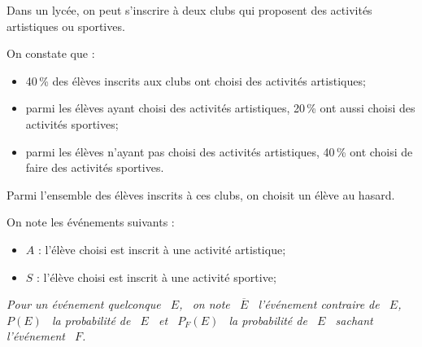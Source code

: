 Dans un lycée, on peut s'inscrire à deux clubs qui proposent des activités artistiques ou sportives.

On constate que :
\begin{itemize}[label=$\bullet$]
	\item 40\,\% des élèves inscrits aux clubs ont choisi des activités artistiques;
	\item parmi les élèves ayant choisi des activités artistiques, 20\,\% ont aussi choisi des activités sportives;
	\item parmi les élèves n'ayant pas choisi des activités artistiques, 40\,\% ont choisi de faire des activités sportives.
\end{itemize}

Parmi l'ensemble des élèves inscrits à ces clubs, on choisit un élève au hasard.

On note les événements suivants :

\begin{itemize}[label=$\bullet$]
\item $A$ : \og{}l'élève choisi est inscrit à une activité artistique\fg{};

\item $S$ :  \og{}l'élève choisi est inscrit à une activité sportive\fg{};
\end{itemize}

\emph{Pour un événement quelconque ~$E$,~ on note ~$\overline{E}$~ l'événement contraire de ~$E$,~ $P(E)$~ la probabilité de ~$E$~ et ~$P_F (E)$~ la probabilité de ~$E$~ sachant l'événement ~$F$.}

